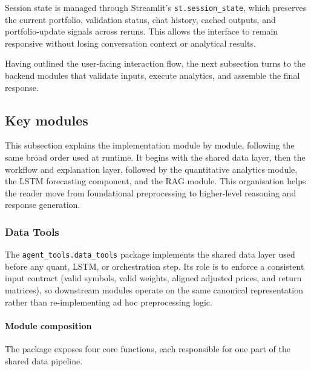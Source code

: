 Session state is managed through Streamlit's \texttt{st.session\_state}, which preserves the current portfolio, validation status, chat history, cached outputs, and portfolio-update signals across reruns. This allows the interface to remain responsive without losing conversation context or analytical results.

Having outlined the user-facing interaction flow, the next subsection turns to the backend modules that validate inputs, execute analytics, and assemble the final response.


\subsection{Key modules}

This subsection explains the implementation module by module, following the same broad order used at runtime. It begins with the shared data layer, then the workflow and explanation layer, followed by the quantitative analytics module, the LSTM forecasting component, and the RAG module. This organisation helps the reader move from foundational preprocessing to higher-level reasoning and response generation.

\subsubsection{Data Tools} 
The \texttt{agent\_tools.data\_tools} package implements the shared data layer used before any quant, LSTM, or orchestration step. Its role is to enforce a consistent input contract (valid symbols, valid weights, aligned adjusted prices, and return matrices), so downstream modules operate on the same canonical representation rather than re-implementing ad hoc preprocessing logic.

\paragraph{Module composition}
The package exposes four core functions, each responsible for one part of the shared data pipeline.

